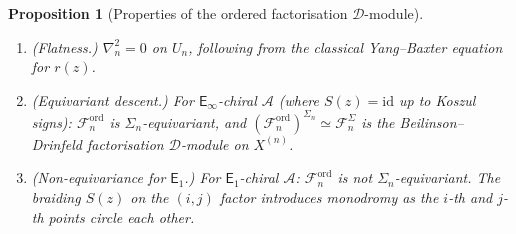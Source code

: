 \documentclass[11pt,reqno]{amsart}
\newtheorem{proposition}[theorem]{Proposition}
\theoremstyle{definition}
\theoremstyle{remark}
\newcommand{\cA}{\mathcal{A}}
\newcommand{\cD}{\mathcal{D}}
\newcommand{\cF}{\mathcal{F}}
\newcommand{\Eone}{\mathsf{E}_{1}}
\newcommand{\Einf}{\mathsf{E}_{\infty}}
\newcommand{\id}{\mathrm{id}}
\numberwithin{equation}{section}
\begin{document}
\begin{proposition}[Properties of the ordered
factorisation $\cD$-module]
\begin{enumerate}[label=\textup{(\roman*)}]
  For affine Kac--Moody at level $k$, two equivalent
  conventions coexist. In the trace-form convention,
  with $\Omega_{\mathrm{tr}}$ the Casimir built from the
  normalised trace form
  $(X,Y)_{\mathrm{tr}}
  = \mathrm{tr}(\mathrm{ad}_X \circ \mathrm{ad}_Y)
  /(2h^\vee)$:
  \begin{equation}\label{eq:kz-km}
    \nabla_n^{\mathrm{KM}}
    = \nabla^{\boxtimes n} + \sum_{i < j}
    \frac{k\,(\Omega_{\mathrm{tr}})_{ij}}{z_i - z_j}
    \, d(z_i - z_j).
  \end{equation}
  In the KZ normalisation, with $\Omega$ the inverse
  Killing form Casimir:
  \begin{equation}\label{eq:kz-km-kz}
    \nabla_n^{\mathrm{KM}}
    = \nabla^{\boxtimes n} + \sum_{i < j}
    \frac{\Omega_{ij}}{(k + h^\vee)(z_i - z_j)}
    \, d(z_i - z_j).
  \end{equation}
  The bridge identity
  $k\,(\Omega_{\mathrm{tr}})_{ij}
  = \Omega_{ij}/(k + h^\vee)$
  equates the two at generic~$k$
  (see~\cite[\S III.2]{Lorgat26I}).
  Both have a \emph{simple pole} along $\Delta_{ij}$:
  the connection is Fuchsian.
\item \textup{(Flatness.)} $\nabla_n^2 = 0$ on $U_n$,
  following from the classical Yang--Baxter equation
  for $r(z)$.
\item \textup{(Equivariant descent.)}
  For $\Einf$-chiral $\cA$ \textup{(}where $S(z) = \id$
  up to Koszul signs\textup{)}:
  $\cF_n^{\mathrm{ord}}$
  is $\Sigma_n$-equivariant, and
  $(\cF_n^{\mathrm{ord}})^{\Sigma_n}
  \simeq \cF_n^{\Sigma}$
  is the Beilinson--Drinfeld factorisation $\cD$-module
  on $X^{(n)}$.
\item \textup{(Non-equivariance for $\Eone$.)}
  For $\Eone$-chiral $\cA$:
  $\cF_n^{\mathrm{ord}}$ is \emph{not}
  $\Sigma_n$-equivariant. The braiding $S(z)$ on the
  $(i,j)$ factor introduces monodromy as the $i$-th and
  $j$-th points circle each other.
\end{enumerate}
\end{proposition}
\end{document}
